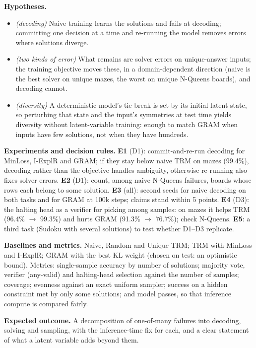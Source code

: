 \documentclass[10pt]{article}
\begin{document}
\textbf{Hypotheses.}
\begin{itemize}
  \item[\textbf{D1}] \emph{(decoding)} Naive training learns the solutions and fails at decoding; committing one
  decision at a time and re-running the model removes errors where solutions diverge.
  \item[\textbf{D2}] \emph{(two kinds of error)} What remains are solver errors on unique-answer inputs; the training
  objective moves these, in a domain-dependent direction (naive is the best solver on unique mazes, the worst on
  unique N-Queens boards), and decoding cannot.
  \item[\textbf{D3}] \emph{(diversity)} A deterministic model's tie-break is set by its initial latent state, so
  perturbing that state and the input's symmetries at test time yields diversity without latent-variable training:
  enough to match GRAM when inputs have few solutions, not when they have hundreds.
\end{itemize}

\textbf{Experiments and decision rules.}
\textbf{E1} (D1): commit-and-re-run decoding for MinLoss, I-ExplR and GRAM; if they stay below naive TRM on mazes
(99.4\%), decoding rather than the objective handles ambiguity, otherwise re-running also fixes solver errors.
\textbf{E2} (D1): count, among naive N-Queens failures, boards whose rows each belong to some solution.
\textbf{E3} (all): second seeds for naive decoding on both tasks and for GRAM at 100k steps; claims stand within
5 points.
\textbf{E4} (D3): the halting head as a verifier for picking among samples: on mazes it helps TRM (96.4\%
$\to$ 99.3\%) and hurts GRAM (91.3\% $\to$ 76.7\%); check N-Queens.
\textbf{E5}: a third task (Sudoku with several solutions) to test whether D1--D3 replicate.

\textbf{Baselines and metrics.} Naive, Random and Unique TRM; TRM with MinLoss and I-ExplR; GRAM with the best KL
weight (chosen on test: an optimistic bound). Metrics: single-sample accuracy by number of solutions; majority vote,
verifier (any-valid) and halting-head selection against the number of samples; coverage; evenness against an exact
uniform sampler; success on a hidden constraint met by only some solutions; and model passes, so that inference
compute is compared fairly.

\textbf{Expected outcome.} A decomposition of one-of-many failures into decoding, solving and sampling, with the
inference-time fix for each, and a clear statement of what a latent variable adds beyond them.
\end{document}
